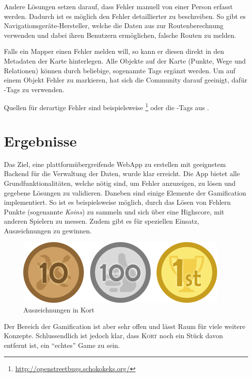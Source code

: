 Andere Lösungen setzen darauf, dass Fehler manuell von einer Person erfasst werden. Dadurch ist es möglich den Fehler detaillierter zu beschreiben. 
So gibt es Navigationsgeräte-Hersteller, welche die Daten aus  zur Routenberechnung verwenden und dabei ihren Benutzern ermöglichen, falsche Routen zu melden.

Falls ein \gls{Mapper} einen Fehler melden will, so kann er diesen direkt in den Metadaten der Karte hinterlegen. Alle Objekte auf der Karte (Punkte, Wege und Relationen) können durch beliebige, sogenannte  \glspl{Tag} ergänzt werden.
Um auf einem Objekt Fehler zu markieren, hat sich die Community darauf geeinigt, dafür -\glspl{Tag} zu verwenden.

Quellen für derartige Fehler sind beispielsweise \footnote{\url{http://openstreetbugs.schokokeks.org/}} oder die -\glspl{Tag} aus .

\section*{Ergebnisse}
Das Ziel, eine plattformübergreifende \gls{WebApp} zu erstellen mit geeignetem Backend für die Verwaltung der Daten, wurde klar erreicht.
Die App bietet alle Grundfunktionalitäten, welche nötig sind, um Fehler anzuzeigen, zu lösen und gegebene Lösungen zu validieren.
Daneben sind einige Elemente der \gls{Gamification} implementiert. So ist es beispielsweise möglich, durch das Lösen von Fehlern Punkte (sogenannte \emph{Koins}) zu sammeln und sich über eine Highscore, mit anderen Spielern zu messen.
Zudem gibt es für speziellen Einsatz, Auszeichnungen zu gewinnen.

\begin{figure}[H]
	\centering
	\includegraphics[scale=0.6]{images/gamification/gamification-badges}
	\caption{Auszeichnungen in Kort}
	\label{image-kort-badges}
\end{figure}

Der Bereich der \gls{Gamification} ist aber sehr offen und lässt Raum für viele weitere Konzepte. Schlussendlich ist jedoch klar, dass \textsc{Kort} noch ein Stück davon entfernt ist, ein "`echtes"' Game zu sein.

